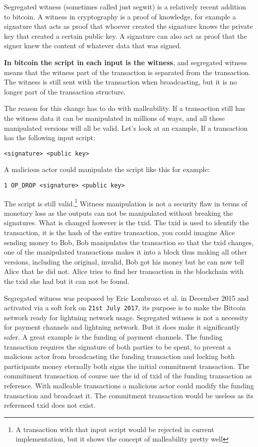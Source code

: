 \label{segwit}
Segregated witness (sometimes called just segwit) is a relatively recent addition to bitcoin. A witness in cryptography is a proof of knowledge, for example a signature that acts as proof that whoever created the signature knows the private key that created a certain public key. A signature can also act as proof that the signer knew the content of whatever data that was signed.\cite{antonopoulos_2017}\cite{ecc_def}

\textbf{In bitcoin the script in each input is the witness}, and segregated witness means that the witness part of the transaction is separated from the transaction. The witness is still sent with the transaction when broadcasting, but it is no longer part of the transaction structure.\cite{antonopoulos_2017}\cite{segwitbip}

The reason for this change has to do with malleability. If a transaction still has the witness data it can be manipulated in millions of ways, and all these manipulated versions will all be valid. Let's look at an example, If a transaction has the following input script:

\texttt{<signature> <public key>}

A malicious actor could manipulate the script like this for example:

\texttt{1 OP\_DROP <signature> <public key>}

The script is still valid.\footnote{A transaction with that input script would be rejected in current implementation, but it shows the concept of malleability pretty well} Witness manipulation is not a security flaw in terms of monetary loss as the outputs can not be manipulated without breaking the signatures. What is changed however is the txid. The txid is used to identify the transaction, it is the hash of the entire transaction, you could imagine Alice sending money to Bob, Bob manipulates the transaction so that the txid changes, one of the manipulated transactions makes it into a block thus making all other versions, including the original, invalid, Bob got his money but he can now tell Alice that he did not. Alice tries to find her transaction in the blockchain with the txid she had but it can not be found.

Segregated witness was proposed by Eric Lombrozo et al. in December 2015 and activated via a soft fork on \texttt{21st July 2017}\cite{antonopoulos_2017}\cite{segwitbip}, its purpose is to make the Bitcoin network ready for lightning network usage.\cite{segwitbip} Segregated witness is not a necessity for payment channels and lightning network. But it does make it significantly safer.\cite{segwitbip} A great example is the funding of payment channels. The funding transaction requires the signature of both parties to be spent, to prevent a malicious actor from broadcasting the funding transaction and locking both participants money eternally both signs the initial commitment transaction. The commitment transaction of course use the id of txid of the funding transaction as reference. With malleable transactions a malicious actor could modify the funding transaction and broadcast it. The commitment transaction would be useless as its referenced txid does not exist.

